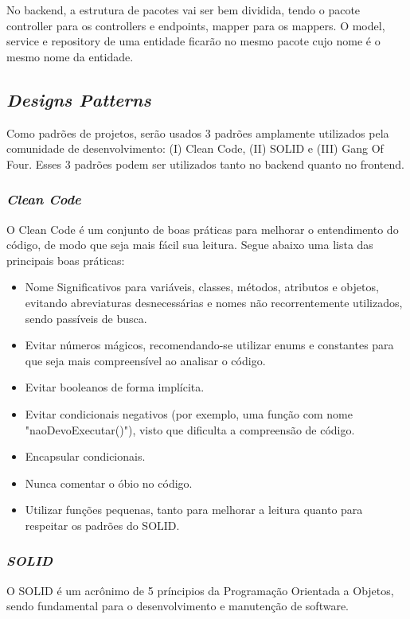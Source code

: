 No backend, a estrutura de pacotes vai ser bem dividida, tendo o pacote controller para os controllers e endpoints, mapper para os mappers. O model, service e repository de uma entidade ficarão no mesmo pacote cujo nome é o mesmo nome da entidade.

\subsection{\emph{Designs Patterns}}

Como padrões de projetos, serão usados 3 padrões amplamente utilizados pela comunidade de desenvolvimento: (I) Clean Code, (II) SOLID e (III) Gang Of Four. Esses 3 padrões podem ser utilizados tanto no backend quanto no frontend.

\subsubsection{\emph{Clean Code}}

O Clean Code é um conjunto de boas práticas para melhorar o entendimento do código, de modo que seja mais fácil sua leitura. Segue abaixo uma lista das principais boas práticas:

\begin{itemize}
	\item Nome Significativos para variáveis, classes, métodos, atributos e objetos, evitando abreviaturas desnecessárias e nomes não recorrentemente utilizados, sendo passíveis de busca.
	\item Evitar números mágicos, recomendando-se utilizar enums e constantes para que seja mais compreensível ao analisar o código.
	\item Evitar booleanos de forma implícita.
	\item Evitar condicionais negativos (por exemplo, uma função com nome "naoDevoExecutar()"), visto que dificulta a compreensão de código.
	\item Encapsular condicionais.
	\item Nunca comentar o óbio no código.
	\item Utilizar funções pequenas, tanto para melhorar a leitura quanto para respeitar os padrões do SOLID.
\end{itemize}

\subsubsection{\emph{SOLID}}

O SOLID é um acrônimo de 5 príncipios da Programação Orientada a Objetos, sendo fundamental para o desenvolvimento e manutenção de software.

